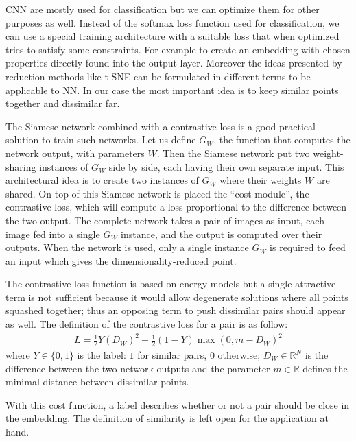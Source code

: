 \documentclass[a4paper,12pt]{report}
\newcommand{\R}{\mathbb{R}}
\begin{document}
CNN are mostly used for classification but we can optimize them for other purposes as well.
Instead of the softmax loss function used for classification, we can use a special training architecture with a suitable loss that when optimized tries to satisfy some constraints.
For example to create an embedding with chosen properties directly found into the output layer.
Moreover the ideas presented by reduction methods like t-SNE can be formulated in different terms to be applicable to NN.
In our case the most important idea is to keep similar points together and dissimilar far.

The Siamese network combined with a contrastive loss is a good practical solution to train such networks\cite{bromley1993signature}\cite{chopra2005learning}.
Let us define $G_W$, the function that computes the network output, with parameters $W$.
Then the Siamese network put two weight-sharing instances of $G_W$ side by side, each having their own separate input.
This architectural idea is to create two instances of $G_W$ where their weights $W$ are shared.
On top of this Siamese network is placed the ``cost module'', the contrastive loss, which will compute a loss proportional to the difference between the two output.
The complete network takes a pair of images as input, each image fed into a single $G_W$ instance, and the output is computed over their outputs.
When the network is used, only a single instance $G_W$ is required to feed an input which gives the dimensionality-reduced point.

The contrastive loss function is based on energy models but a single attractive term is not sufficient because it would allow degenerate solutions where all points squashed together; thus an opposing term to push dissimilar pairs should appear as well.
The definition of the contrastive loss for a pair is as follow:
\begin{eqnarray}
    L = \frac{1}{2} Y (D_W)^2 + \frac{1}{2} (1-Y) \max(0, m - D_W)^2
\end{eqnarray}
where $Y \in \{0,1\}$ is the label: $1$ for similar pairs, $0$ otherwise; $D_W \in \R^N$ is the difference between the two network outputs and the parameter $m \in \R$ defines the minimal distance between dissimilar points.

With this cost function, a label describes whether or not a pair should be close in the embedding.
The definition of similarity is left open for the application at hand.
\end{document}
